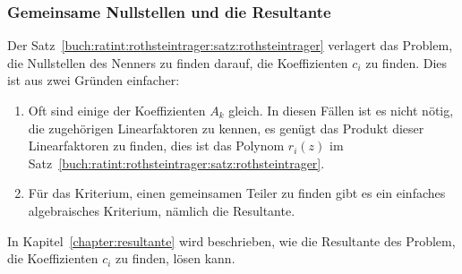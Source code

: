 %
%
\subsubsection{Gemeinsame Nullstellen und die Resultante}
Der Satz~\ref{buch:ratint:rothsteintrager:satz:rothsteintrager}
verlagert das Problem, die Nullstellen des Nenners zu finden darauf,
die Koeffizienten $c_i$ zu finden.
Dies ist aus zwei Gründen einfacher:
\begin{enumerate}
\item
Oft sind einige der Koeffizienten $A_k$ gleich.
In diesen Fällen ist es nicht nötig, die zugehörigen Linearfaktoren
zu kennen, es genügt das Produkt dieser Linearfaktoren zu finden,
dies ist das Polynom $r_i(z)$ im
Satz~\ref{buch:ratint:rothsteintrager:satz:rothsteintrager}.
\item
Für das Kriterium, einen gemeinsamen Teiler zu finden gibt es
ein einfaches algebraisches Kriterium, nämlich die Resultante.
\end{enumerate}

In Kapitel~\ref{chapter:resultante} wird beschrieben, wie die 
Resultante des Problem, die Koeffizienten $c_i$ zu finden, lösen
kann.
%

